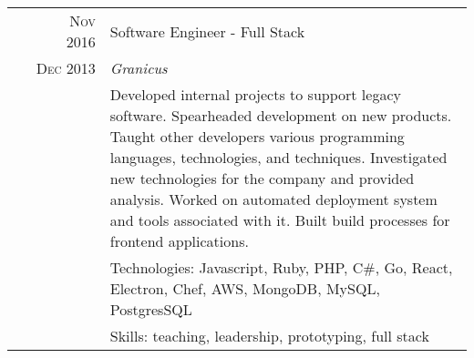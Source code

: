 \documentclass[a4paper,10pt]{article}
\begin{document}
\begin{tabular}{r|p{11cm}}
  \ \ \ \ \ \ \ \textsc{Nov 2016} & Software Engineer - Full Stack\\
                \textsc{Dec 2013} & \emph{Granicus}\\
                                  & \footnotesize{Developed internal projects to support legacy software. Spearheaded development on new products. Taught other developers various programming languages, technologies, and techniques. Investigated new technologies for the company and provided analysis. Worked on automated deployment system and tools associated with it. Built build processes for frontend applications.}\\
                                  & \footnotesize{Technologies: Javascript, Ruby, PHP, C\#, Go, React, Electron, Chef, AWS, MongoDB, MySQL, PostgresSQL}\\
                                  & \footnotesize{Skills: teaching, leadership, prototyping, full stack}\\
\end{tabular}
\end{document}
